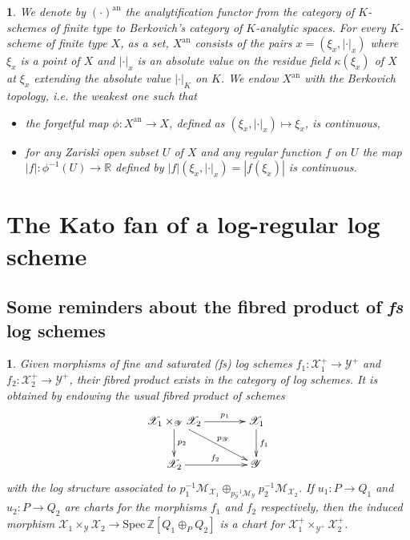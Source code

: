 \documentclass{amsart}%
\numberwithin{equation}{subsection}
\theoremstyle{plain2}
\theoremstyle{definition2}
\theoremstyle{stepstyle}
\theoremstyle{point}
\theoremstyle{subpoint}
\newtheorem{subpoint}[equation]{}%
\newcommand{\spa}[1]{\begin{subpoint}#1\end{subpoint}}           %
\newcommand{\Z}{\ensuremath{\mathbb{Z}}}
\newcommand{\R}{\ensuremath{\mathbb{R}}}
\newcommand{\cX}{\ensuremath{\mathscr{X}}}
\newcommand{\caM}{\ensuremath{\mathcal{M}}}
\newcommand{\cY}{\ensuremath{\mathscr{Y}}}
\renewcommand{\R}{\ensuremath{\mathbb{R}}}
\renewcommand{\cY}{\ensuremath{\mathscr{Y}}}
\newcommand{\Spec}{\ensuremath{\mathrm{Spec}\,}}
\newcommand{\an}{\mathrm{an}}
\begin{document}
\spa{We denote by $(\cdot)^{\an}$ the analytification functor from the category of $K$-schemes of finite type to Berkovich's category of $K$-analytic spaces. For every $K$-scheme of finite type $X$, as a set, $X^{\an}$ consists of the pairs $x=(\xi_x,|\cdot|_x)$ where $\xi_x$ is a point of $X$ and $|\cdot|_x$ is an absolute value on the residue field $\kappa(\xi_x)$ of $X$ at $\xi_x$ extending the absolute value $|\cdot|_K$ on $K$. We endow $X^{\an}$ with the Berkovich topology, i.e. the weakest one such that \begin{itemize}
\item[(i)] the forgetful map $\phi: X^{\an} \rightarrow X$, defined as $(\xi_x,|\cdot|_x) \mapsto \xi_x$, is continuous,
\item[(ii)] for any Zariski open subset $U$ of $X$ and any regular function $f$ on $U$ the map $|f|:\phi^{-1}(U) \rightarrow \R$ defined by $|f|(\xi_x,|\cdot|_x)=|f(\xi_x)|$ is continuous. 
\end{itemize}}

\section{The Kato fan of a log-regular log scheme} \label{sect kato fan}

\subsection{Some reminders about the fibred product of \textit{fs} log schemes} \label{sect fs product}
\spa{Given morphisms of fine and saturated (\emph{fs}) log schemes $f_1: \cX_1^+ \rightarrow \cY^+$ and $f_2: \cX_2^+ \rightarrow \cY^+$, their fibred product exists in the category of log schemes. It is obtained by endowing the usual fibred product of schemes
\begin{equation} \label{fibered product diagram}
\begin{gathered}
\xymatrixcolsep{3pc} \xymatrix{
  \cX_1\times_{\cY} \cX_2 \ar[r]^-{p_1} \ar[dr]^-{p_{\cY}} \ar[d]^-{p_2} & \cX_1 \ar[d]^{f_1}\\
  \cX_2 \ar[r]^{f_2}   & \cY
}
\end{gathered}
\end{equation}
with the log structure associated to $p_1^{-1}\caM_{\cX_1} \oplus_{p_{\cY}^{-1}\caM_{\cY}} p_2^{-1}\caM_{\cX_2}$. If $u_1:P \rightarrow Q_1$ and $u_2:P \rightarrow Q_2$ are charts for the morphisms $f_1$ and $f_2$ respectively, then the induced morphism $\cX_1\times_{\cY} \cX_2 \rightarrow \Spec \Z[Q_1 \oplus_P Q_2]$ is a chart for $\cX_1^+\times_{\cY^+} \cX_2^+$. }
\end{document}
